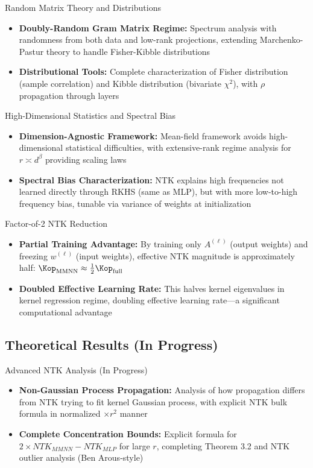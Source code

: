 \documentclass[aspectratio=169]{beamer}
\begin{document}
\begin{frame}{Random Matrix Theory and Distributions}
\begin{itemize}
\item \textbf{Doubly-Random Gram Matrix Regime:} Spectrum analysis with randomness from both data and low-rank projections, extending Marchenko-Pastur theory to handle Fisher-Kibble distributions
\item \textbf{Distributional Tools:} Complete characterization of Fisher distribution (sample correlation) and Kibble distribution (bivariate $\chi^2$), with $\rho$ propagation through layers
\end{itemize}
\end{frame}

\begin{frame}{High-Dimensional Statistics and Spectral Bias}
\begin{itemize}
\item \textbf{Dimension-Agnostic Framework:} Mean-field framework avoids high-dimensional statistical difficulties, with extensive-rank regime analysis for $r \asymp d^\beta$ providing scaling laws
\item \textbf{Spectral Bias Characterization:} NTK explains high frequencies not learned directly through RKHS (same as MLP), but with more low-to-high frequency bias, tunable via variance of weights at initialization
\end{itemize}
\end{frame}

\begin{frame}{Factor-of-2 NTK Reduction}
\begin{itemize}
\item \textbf{Partial Training Advantage:} By training only $A^{(\ell)}$ (output weights) and freezing $w^{(\ell)}$ (input weights), effective NTK magnitude is approximately half: $\Kop_{\text{MMNN}} \approx \frac{1}{2} \Kop_{\text{full}}$
\item \textbf{Doubled Effective Learning Rate:} This halves kernel eigenvalues in kernel regression regime, doubling effective learning rate—a significant computational advantage
\end{itemize}
\end{frame}

\subsection{Theoretical Results (In Progress)}

\begin{frame}{Advanced NTK Analysis (In Progress)}
\begin{itemize}
\item \textbf{Non-Gaussian Process Propagation:} Analysis of how propagation differs from NTK trying to fit kernel Gaussian process, with explicit NTK bulk formula in normalized $\times r^2$ manner
\item \textbf{Complete Concentration Bounds:} Explicit formula for $2 \times NTK_{MMNN} - NTK_{MLP}$ for large $r$, completing Theorem 3.2 and NTK outlier analysis (Ben Arous-style)
\end{itemize}
\end{frame}
\end{document}
